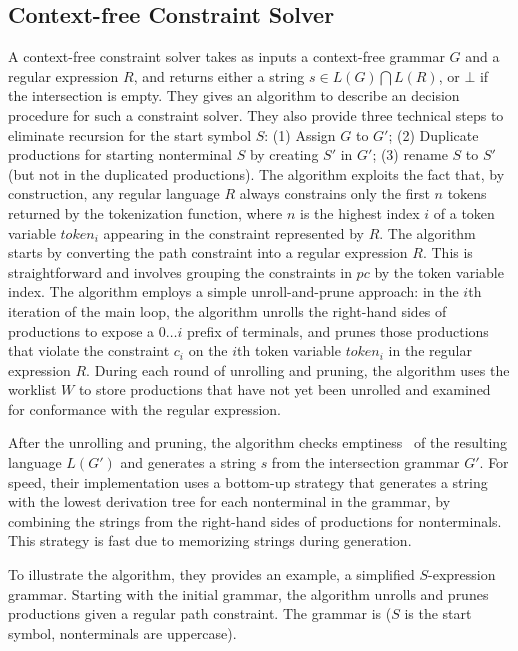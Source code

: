 \subsection{Context-free Constraint Solver}
A context-free constraint solver takes as inputs a context-free grammar $G$ and a regular expression $R$, and returns either a string $s \in L(G) \bigcap L(R)$, or $\bot$ if the intersection is empty. They gives an algorithm to describe an decision procedure for such a constraint solver. They also provide three technical steps to eliminate recursion for the
start symbol $S$: (1) Assign $G$ to $G'$; (2) Duplicate productions for starting nonterminal $S$ by creating $S'$ in $G'$; (3) rename $S$ to $S'$ (but not in the duplicated productions). The algorithm exploits the fact that, by construction, any regular language $R$ always constrains only the first $n$ tokens returned by the tokenization function, where $n$ is the highest index $i$ of a token variable $token_i$ appearing in the constraint represented by $R$. The algorithm starts by converting the path constraint into a regular expression $R$. This is straightforward and involves grouping the constraints in $pc$ by the token variable index. The algorithm employs a simple unroll-and-prune approach: in the $i$th iteration of the main loop, the algorithm unrolls the right-hand sides of productions to expose a $0 \ldots i$ prefix of terminals, and prunes those productions that violate the constraint $c_i$ on the $i$th token variable $token_i$ in the regular expression $R$. During each round of unrolling and pruning, the algorithm uses the worklist $W$ to store productions that have not yet been unrolled and examined for conformance with the regular expression.

After the unrolling and pruning, the algorithm checks emptiness~\cite{theorybook} of the resulting language $L(G')$ and generates a string $s$ from the intersection grammar $G'$. For speed, their implementation uses a bottom-up strategy
that generates a string with the lowest derivation tree for each nonterminal in the grammar, by combining the strings
from the right-hand sides of productions for nonterminals. This strategy is fast due to memorizing strings during generation.

To illustrate the algorithm, they provides an example, a simplified $S$-expression grammar. Starting with the initial
grammar, the algorithm unrolls and prunes productions given a regular path constraint. The grammar is ($S$ is the start
symbol, nonterminals are uppercase).

